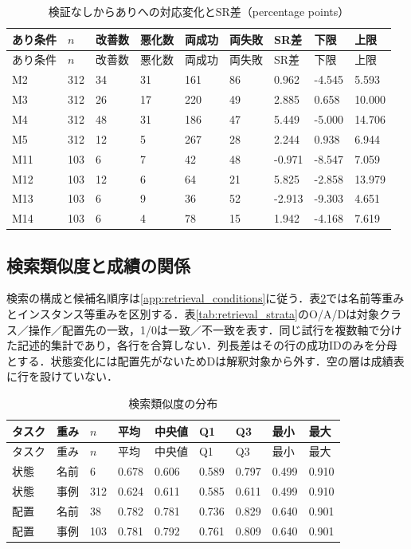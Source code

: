 {\scriptsize\setlength{\tabcolsep}{3pt}
\begin{longtable}{lllllllll}
\caption{検証なしからありへの対応変化とSR差（percentage points）}\label{tab:paired_intervals}\\
\hline
あり条件 & $n$ & 改善数 & 悪化数 & 両成功 & 両失敗 & SR差 & 下限 & 上限\\\hline\endfirsthead
あり条件 & $n$ & 改善数 & 悪化数 & 両成功 & 両失敗 & SR差 & 下限 & 上限\\\hline\endhead
\hline\endfoot
M2 & 312 & 34 & 31 & 161 & 86 & 0.962 & -4.545 & 5.593 \\
M3 & 312 & 26 & 17 & 220 & 49 & 2.885 & 0.658 & 10.000 \\
M4 & 312 & 48 & 31 & 186 & 47 & 5.449 & -5.000 & 14.706 \\
M5 & 312 & 12 & 5 & 267 & 28 & 2.244 & 0.938 & 6.944 \\
M11 & 103 & 6 & 7 & 42 & 48 & -0.971 & -8.547 & 7.059 \\
M12 & 103 & 12 & 6 & 64 & 21 & 5.825 & -2.858 & 13.979 \\
M13 & 103 & 6 & 9 & 36 & 52 & -2.913 & -9.303 & 4.651 \\
M14 & 103 & 6 & 4 & 78 & 15 & 1.942 & -4.168 & 7.619 \\
\end{longtable}}

\subsection{検索類似度と成績の関係}
検索の構成と候補名順序は\ref{app:retrieval_conditions}に従う．表\ref{tab:retrieval_distribution}では名前等重みとインスタンス等重みを区別する．表\ref{tab:retrieval_strata}のO/A/Dは対象クラス／操作／配置先の一致，1/0は一致／不一致を表す．同じ試行を複数軸で分けた記述的集計であり，各行を合算しない．列長差はその行の成功IDのみを分母とする．状態変化には配置先がないためDは解釈対象から外す．空の層は成績表に行を設けていない．

{\scriptsize\setlength{\tabcolsep}{3pt}
\begin{longtable}{lllllllll}
\caption{検索類似度の分布}\label{tab:retrieval_distribution}\\
\hline
タスク & 重み & $n$ & 平均 & 中央値 & Q1 & Q3 & 最小 & 最大\\\hline\endfirsthead
タスク & 重み & $n$ & 平均 & 中央値 & Q1 & Q3 & 最小 & 最大\\\hline\endhead
\hline\endfoot
状態 & 名前 & 6 & 0.678 & 0.606 & 0.589 & 0.797 & 0.499 & 0.910 \\
状態 & 事例 & 312 & 0.624 & 0.611 & 0.585 & 0.611 & 0.499 & 0.910 \\
配置 & 名前 & 38 & 0.782 & 0.781 & 0.736 & 0.829 & 0.640 & 0.901 \\
配置 & 事例 & 103 & 0.781 & 0.792 & 0.761 & 0.809 & 0.640 & 0.901 \\
\end{longtable}}

